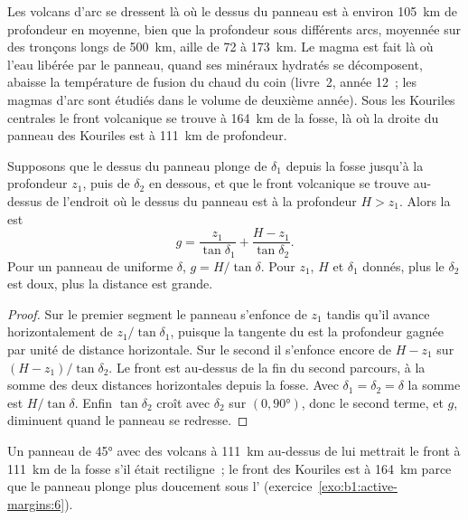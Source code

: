 Les volcans d'arc se dressent là où le dessus du panneau est à environ \qty{105}{km} de profondeur en
moyenne, bien que la profondeur sous différents arcs, moyennée sur des tronçons
longs de \qty{500}{km}, aille de 72 à \qty{173}{km}. Le magma
est fait là où l'eau libérée par le panneau, quand ses minéraux hydratés se décomposent,
abaisse la température de fusion du  chaud du coin (livre~2, année
12~; les magmas d'arc sont étudiés dans le volume de deuxième année). Sous les
Kouriles centrales le front volcanique se trouve à \qty{164}{km} de la fosse, là où la
droite du panneau des Kouriles est à \qty{111}{km} de profondeur.

\begin{proposition}\label{prop:b1:active-margins:gap}
Supposons que le dessus du panneau plonge de $\delta_1$ depuis la fosse jusqu'à la
profondeur $z_1$, puis de $\delta_2$ en dessous, et que le front volcanique se trouve
au-dessus de l'endroit où le dessus du panneau est à la profondeur $H > z_1$. Alors la
 est
\[
  g = \frac{z_1}{\tan\delta_1} + \frac{H - z_1}{\tan\delta_2} .
\]
Pour un panneau de  uniforme $\delta$, $g = H/\tan\delta$. Pour $z_1$, $H$
et $\delta_1$ donnés, plus le  $\delta_2$ est doux, plus la distance est grande.
\end{proposition}

\begin{proof}
Sur le premier segment le panneau s'enfonce de $z_1$ tandis qu'il avance horizontalement de
$z_1/\tan\delta_1$, puisque la tangente du  est la profondeur gagnée par unité
de distance horizontale. Sur le second il s'enfonce encore de $H - z_1$ sur
$(H - z_1)/\tan\delta_2$. Le front est au-dessus de la fin du second parcours, à la
somme des deux distances horizontales depuis la fosse. Avec $\delta_1 = \delta_2
= \delta$ la somme est $H/\tan\delta$. Enfin $\tan\delta_2$ croît avec
$\delta_2$ sur $(0, \ang{90})$, donc le second terme, et $g$, diminuent quand le panneau
se redresse.
\end{proof}

Un panneau de \ang{45} avec des volcans à \qty{111}{km} au-dessus de lui mettrait le
front à \qty{111}{km} de la fosse s'il était rectiligne~; le front des Kouriles est à
\qty{164}{km} parce que le panneau plonge plus doucement sous l'
(exercice~\ref{exo:b1:active-margins:6}).

